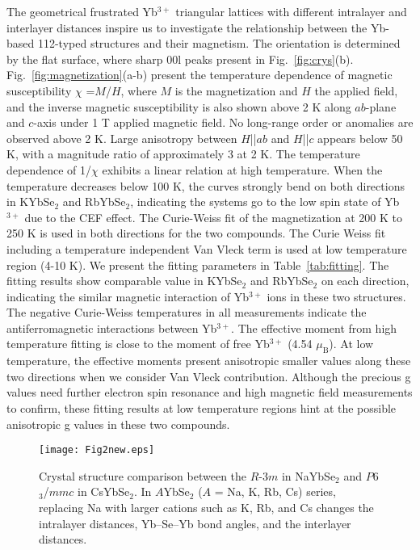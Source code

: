\documentclass[%
 aip,
 amsmath,amssymb,
 reprint,%
]{revtex4-1}
\begin{document}
The geometrical frustrated Yb$^{3+}$ triangular lattices with different intralayer and interlayer distances inspire us to investigate the relationship between the Yb-based 112-typed structures and their magnetism. The orientation is determined by the flat surface, where sharp 00l peaks present in Fig.~\ref{fig:crys}(b). Fig.~\ref{fig:magnetization}(a-b) present the temperature dependence of magnetic susceptibility $\chi$ =$M$/$H$, where $M$ is the magnetization and $H$ the applied field, and the inverse magnetic susceptibility is also shown above 2 K along $ab$-plane and $c$-axis under 1 T applied magnetic field. No long-range order or anomalies are observed above 2 K. Large anisotropy between $H$||$ab$ and $H$||$c$ appears below 50 K, with a magnitude ratio of approximately 3 at 2 K. The temperature dependence of 1/$\chi$ exhibits a linear relation at high temperature. When the temperature decreases below 100 K, the curves strongly bend on both directions in KYbSe$_2$ and RbYbSe$_2$, indicating the systems go to the low spin state of Yb$^{3+}$ due to the CEF effect. The Curie-Weiss fit of the magnetization at 200 K to 250 K is used in both directions for the two compounds. The Curie Weiss fit including a temperature independent Van Vleck term is used at low temperature region (4-10 K). We present the fitting parameters in Table~\ref{tab:fitting}. The fitting results show comparable value in KYbSe$_2$ and RbYbSe$_2$ on each direction, indicating the similar magnetic interaction of Yb$^{3+}$ ions in these two structures. The negative Curie-Weiss temperatures in all measurements indicate the antiferromagnetic interactions between Yb$^{3+}$. The effective moment from high temperature fitting is close to the moment of free Yb$^{3+}$ (4.54 $\mu_{\mathrm{B}}$). At low temperature, the effective moments present anisotropic smaller values along these two directions when we consider Van Vleck contribution. Although the precious g values need further electron spin resonance and high magnetic field measurements to confirm, these fitting results at low temperature regions hint at the possible anisotropic g values in these two compounds.

\begin{figure}[tbh]
\texttt{[image: Fig2new.eps]}
\caption {\label{fig:struc}Crystal structure comparison between the $R$-3$m$ in NaYbSe$_2$ and $P$6$_3$/$mmc$ in CsYbSe$_2$. In $A$YbSe$_2$ ($A$ = Na, K, Rb, Cs) series, replacing Na with larger cations such as K, Rb, and Cs changes the intralayer distances, Yb–Se–Yb bond angles, and the interlayer distances.}
\label{crystal}
\end{figure}
\end{document}
